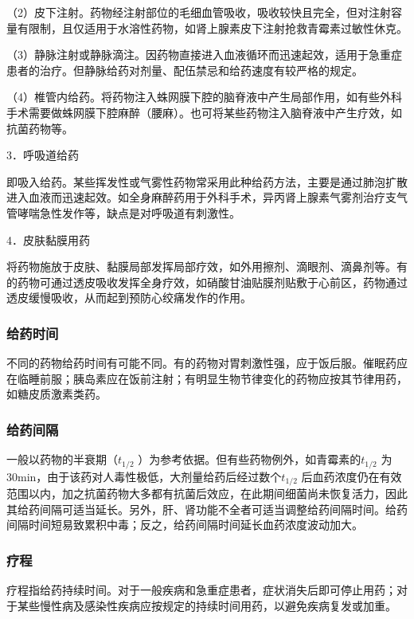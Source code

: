 （2）皮下注射。药物经注射部位的毛细血管吸收，吸收较快且完全，但对注射容量有限制，且仅适用于水溶性药物，如肾上腺素皮下注射抢救青霉素过敏性休克。

（3）静脉注射或静脉滴注。因药物直接进入血液循环而迅速起效，适用于急重症患者的治疗。但静脉给药对剂量、配伍禁忌和给药速度有较严格的规定。

（4）椎管内给药。将药物注入蛛网膜下腔的脑脊液中产生局部作用，如有些外科手术需要做蛛网膜下腔麻醉（腰麻）。也可将某些药物注入脑脊液中产生疗效，如抗菌药物等。

3．呼吸道给药

即吸入给药。某些挥发性或气雾性药物常采用此种给药方法，主要是通过肺泡扩散进入血液而迅速起效。如全身麻醉药用于外科手术，异丙肾上腺素气雾剂治疗支气管哮喘急性发作等，缺点是对呼吸道有刺激性。

4．皮肤黏膜用药

将药物施放于皮肤、黏膜局部发挥局部疗效，如外用擦剂、滴眼剂、滴鼻剂等。有的药物可通过透皮吸收发挥全身疗效，如硝酸甘油贴膜剂贴敷于心前区，药物通过透皮缓慢吸收，从而起到预防心绞痛发作的作用。

\subsubsection{给药时间}

不同的药物给药时间有可能不同。有的药物对胃刺激性强，应于饭后服。催眠药应在临睡前服；胰岛素应在饭前注射；有明显生物节律变化的药物应按其节律用药，如糖皮质激素类药。

\subsubsection{给药间隔}

一般以药物的半衰期（$t_{1/2}$
）为参考依据。但有些药物例外，如青霉素的$t_{1/2}$
为30min，由于该药对人毒性极低，大剂量给药后经过数个$t_{1/2}$
后血药浓度仍在有效范围以内，加之抗菌药物大多都有抗菌后效应，在此期间细菌尚未恢复活力，因此其给药间隔可适当延长。另外，肝、肾功能不全者可适当调整给药间隔时间。给药间隔时间短易致累积中毒；反之，给药间隔时间延长血药浓度波动加大。

\subsubsection{疗程}

疗程指给药持续时间。对于一般疾病和急重症患者，症状消失后即可停止用药；对于某些慢性病及感染性疾病应按规定的持续时间用药，以避免疾病复发或加重。

